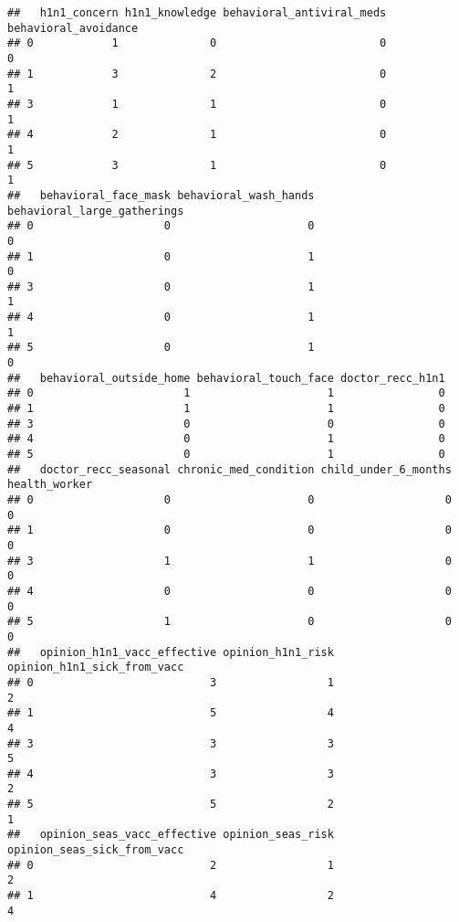 \documentclass[
]{article}
\begin{document}
\begin{verbatim}
##   h1n1_concern h1n1_knowledge behavioral_antiviral_meds behavioral_avoidance
## 0            1              0                         0                    0
## 1            3              2                         0                    1
## 3            1              1                         0                    1
## 4            2              1                         0                    1
## 5            3              1                         0                    1
##   behavioral_face_mask behavioral_wash_hands behavioral_large_gatherings
## 0                    0                     0                           0
## 1                    0                     1                           0
## 3                    0                     1                           1
## 4                    0                     1                           1
## 5                    0                     1                           0
##   behavioral_outside_home behavioral_touch_face doctor_recc_h1n1
## 0                       1                     1                0
## 1                       1                     1                0
## 3                       0                     0                0
## 4                       0                     1                0
## 5                       0                     1                0
##   doctor_recc_seasonal chronic_med_condition child_under_6_months health_worker
## 0                    0                     0                    0             0
## 1                    0                     0                    0             0
## 3                    1                     1                    0             0
## 4                    0                     0                    0             0
## 5                    1                     0                    0             0
##   opinion_h1n1_vacc_effective opinion_h1n1_risk opinion_h1n1_sick_from_vacc
## 0                           3                 1                           2
## 1                           5                 4                           4
## 3                           3                 3                           5
## 4                           3                 3                           2
## 5                           5                 2                           1
##   opinion_seas_vacc_effective opinion_seas_risk opinion_seas_sick_from_vacc
## 0                           2                 1                           2
## 1                           4                 2                           4

\end{verbatim}
\end{document}
